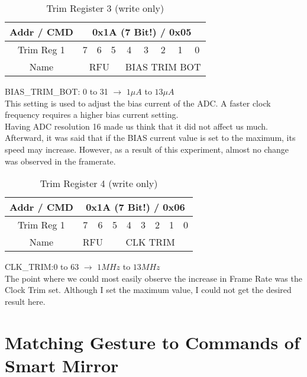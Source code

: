 \documentclass[thesis]{deutez}
\begin{document}
\begin{table}[h!]
	\begin{center}
		\caption{Trim Register 3 (write only)\cite{datasheet}}
		\begin{tabular}{|c|c|c|c|c|c|c|c|c|}
			\hline
			Addr / CMD & \multicolumn{8}{c|}{0x1A (7 Bit!) / 0x05} \\
			\hline
			Trim Reg 1 & 7 & 6 &5  &4  &3  &2  &1&0  \\
			\hline
	Name & \multicolumn{3}{c|}{RFU} & \multicolumn{5}{c|}{BIAS TRIM BOT}\\
			\hline
		\end{tabular}
	\end{center}
\end{table}
\FloatBarrier
BIAS\_TRIM\_BOT: 0 to 31 $ \longrightarrow $ $ 1\mu A $ to $ 13 \mu A $\\
This setting is used to adjust the bias current of the ADC. A faster clock frequency requires a
higher bias current setting.\cite{datasheet}\\

Having ADC resolution 16 made us think that it did not affect us much. Afterward, it was said that if the BIAS current value is set to the maximum, its speed may increase. However, as a result of this experiment, almost no change was observed in the framerate.\\

\begin{table}[h!]
	\begin{center}
		\caption{Trim Register 4 (write only)\cite{datasheet}}
		\begin{tabular}{|c|c|c|c|c|c|c|c|c|}
			\hline
			Addr / CMD & \multicolumn{8}{c|}{0x1A (7 Bit!) / 0x06} \\
			\hline
			Trim Reg 1 & 7 & 6 &5  &4  &3  &2  &1&0  \\
			\hline
			Name & \multicolumn{2}{c|}{RFU} & \multicolumn{6}{c|}{CLK TRIM}\\
			\hline
		\end{tabular}
	\end{center}
\end{table}
\FloatBarrier
CLK\_TRIM:0 to 63 $ \longrightarrow $ $ 1 MHz $ to $ 13 MHz $\\

The point where we could most easily observe the increase in Frame Rate was the Clock Trim set. Although I set the maximum value, I could not get the desired result here.\\
\section{Matching Gesture to Commands of Smart Mirror}
\end{document}
